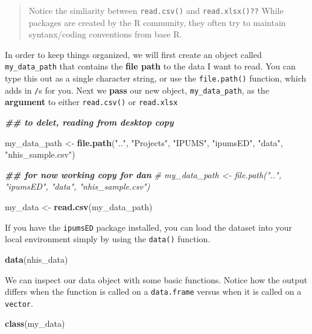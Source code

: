 \documentclass[
]{book}
\newenvironment{Shaded}{\begin{snugshade}}{\end{snugshade}}
\newcommand{\CommentTok}[1]{\textcolor[rgb]{0.56,0.35,0.01}{\textit{#1}}}
\newcommand{\DocumentationTok}[1]{\textcolor[rgb]{0.56,0.35,0.01}{\textbf{\textit{#1}}}}
\newcommand{\FunctionTok}[1]{\textcolor[rgb]{0.13,0.29,0.53}{\textbf{#1}}}
\newcommand{\NormalTok}[1]{#1}
\newcommand{\OtherTok}[1]{\textcolor[rgb]{0.56,0.35,0.01}{#1}}
\newcommand{\StringTok}[1]{\textcolor[rgb]{0.31,0.60,0.02}{#1}}
\begin{document}
\begin{quote}
Notice the simliarity between \texttt{read.csv()} and \texttt{read.xlsx()??}
While packages are created by the R community, they often try to maintain syntanx/coding conventions from base R.
\end{quote}

In order to keep things organized, we will first create an object called \texttt{my\_data\_path} that contains the \textbf{file path} to the data I want to read. You can type this out as a single character string, or use the \texttt{file.path()} function, which adds in \texttt{/}s for you. Next we \textbf{pass} our new object, \texttt{my\_data\_path}, as the \textbf{argument} to either \texttt{read.csv()} or \texttt{read.xlsx}

\begin{Shaded}
\begin{Highlighting}[]
\DocumentationTok{\#\# to delet, reading from desktop copy}

\NormalTok{my\_data\_path }\OtherTok{\textless{}{-}} \FunctionTok{file.path}\NormalTok{(}\StringTok{".."}\NormalTok{, }\StringTok{"Projects"}\NormalTok{, }\StringTok{"IPUMS"}\NormalTok{, }\StringTok{"ipumsED"}\NormalTok{, }\StringTok{"data"}\NormalTok{, }\StringTok{"nhis\_sample.csv"}\NormalTok{)}

\DocumentationTok{\#\# for now working copy for dan}
\CommentTok{\# my\_data\_path \textless{}{-} file.path("..", "ipumsED", "data", "nhis\_sample.csv")}



\NormalTok{my\_data }\OtherTok{\textless{}{-}} \FunctionTok{read.csv}\NormalTok{(my\_data\_path)}
\end{Highlighting}
\end{Shaded}

If you have the \texttt{ipumsED} package installed, you can load the dataset into your local environment simply by using the \texttt{data()} function.

\begin{Shaded}
\begin{Highlighting}[]
\FunctionTok{data}\NormalTok{(nhis\_data)}
\end{Highlighting}
\end{Shaded}

We can inspect our data object with some basic functions. Notice how the output differs when the function is called on a \texttt{data.frame} versus when it is called on a \texttt{vector}.

\begin{Shaded}
\begin{Highlighting}[]
\FunctionTok{class}\NormalTok{(my\_data)}
\end{Highlighting}
\end{Shaded}
\end{document}
